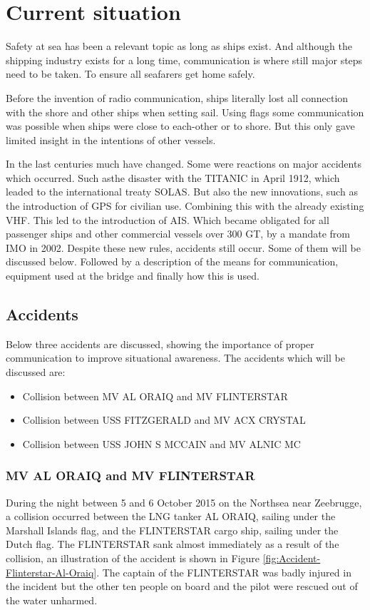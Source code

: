 \chapter{Current situation}
Safety at sea has been a relevant topic as long as ships exist. And although the shipping industry exists for a long time, communication is where still major steps need to be taken. To ensure all seafarers get home safely.

Before the invention of radio communication, ships literally lost all connection with the shore and other ships when setting sail. Using flags some communication was possible when ships were close to each-other or to shore. But this only gave limited insight in the intentions of other vessels. 

In the last centuries much have changed. Some were reactions on major accidents which occurred. Such asthe disaster with the TITANIC in April 1912, which leaded to the international treaty \ac{SOLAS}. But also the new innovations, such as the introduction of \ac{GPS} for civilian use. Combining this with the already existing \ac{VHF}. This led to the introduction of \ac{AIS}. Which became obligated for all passenger ships and other commercial vessels over 300 \ac{GT}, by a mandate from \ac{IMO} in 2002.
Despite these new rules, accidents still occur. Some of them will be discussed below. Followed by a description of the means for communication, equipment used at the bridge and finally how this is used.

\section{Accidents}
Below three accidents are discussed, showing the importance of proper communication to improve situational awareness. The accidents which will be discussed are:
\begin{itemize}
	\item Collision between MV AL ORAIQ and MV FLINTERSTAR
	\item Collision between USS FITZGERALD and MV ACX CRYSTAL
	\item Collision between USS JOHN S MCCAIN and MV ALNIC MC
\end{itemize}

\newpage
\subsection{MV AL ORAIQ and MV FLINTERSTAR}
\label{sec:al-oraiq-vs-flinterstar}
During the night between 5 and 6 October 2015 on the Northsea near Zeebrugge, a collision occurred between the LNG tanker AL ORAIQ, sailing under the Marshall Islands flag, and the FLINTERSTAR cargo ship, sailing under the Dutch flag. The FLINTERSTAR sank almost immediately as a result of the collision, an illustration of the accident is shown in Figure \ref{fig:Accident-Flinterstar-Al-Oraiq}. The captain of the FLINTERSTAR was badly injured in the incident but the other ten people on board and the pilot were rescued out of the water unharmed.

